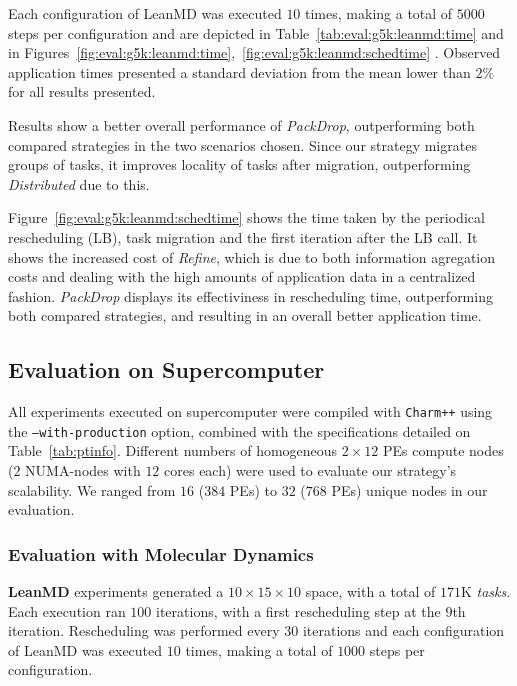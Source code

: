 Each configuration of LeanMD was executed $10$ times, making a total of $5000$ steps per configuration and are depicted in Table~\ref{tab:eval:g5k:leanmd:time} and in Figures~\ref{fig:eval:g5k:leanmd:time},~\ref{fig:eval:g5k:leanmd:schedtime} .
Observed application times presented a standard deviation from the mean lower than $2\%$ for all results presented.

Results show a better overall performance of \textit{PackDrop}, outperforming both compared strategies in the two scenarios chosen.
Since our strategy migrates groups of tasks, it improves locality of tasks after migration, outperforming \textit{Distributed} due to this.

Figure~\ref{fig:eval:g5k:leanmd:schedtime} shows the time taken by the periodical rescheduling (LB), task migration and the first iteration after the LB call.
It shows the increased cost of \textit{Refine}, which is due to both information agregation costs and dealing with the high amounts of application data in a centralized fashion.
\textit{PackDrop} displays its effectiviness in rescheduling time, outperforming both compared strategies, and resulting in an overall better application time. 

\subsection{Evaluation on Supercomputer}

All experiments executed on supercomputer were compiled with \texttt{Charm++} using the \texttt{--with-production} option, combined with the specifications detailed on Table~\ref{tab:ptinfo}.
Different numbers of homogeneous $2\times 12$ PEs compute nodes ($2$ NUMA-nodes with $12$ cores each) were used to evaluate our strategy's scalability.
We ranged from $16$ ($384$ PEs) to $32$ ($768$ PEs) unique nodes in our evaluation. 

\subsubsection*{Evaluation with Molecular Dynamics}

\textbf{LeanMD} experiments generated a $10\times15\times10$ space, with a total of $171$K \textit{tasks}.
Each execution ran $100$ iterations, with a first rescheduling step at the $9$th iteration. 
Rescheduling was performed every $30$ iterations and each configuration of LeanMD was executed $10$ times, making a total of $1000$ steps per configuration. 

